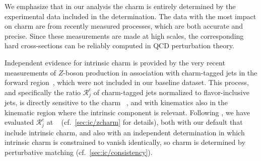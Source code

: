 We emphasize that in our analysis the charm \pdf is entirely
determined by the experimental data included in the \pdf determination.
The data with the most impact on charm are from recently measured \lhc
processes, which are both accurate and precise.
%
Since these measurements are made at high scales, the corresponding
hard cross-sections can be reliably computed in QCD perturbation theory.

Independent evidence for intrinsic charm
is provided by the very recent \lhcb measurements of $Z$-boson production
in association with charm-tagged jets in the forward
region~\cite{LHCb:2021stx}, which were not included in our baseline dataset.
%
This process, and specifically the ratio $\mathcal{R}_j^c$
of charm-tagged jets normalized to flavor-inclusive jets,
is directly sensitive to the charm \pdf~\cite{Boettcher:2015sqn}, and
with \lhcb kinematics also
in the kinematic region  where the  intrinsic component is relevant.
%
Following \cite{Boettcher:2015sqn,LHCb:2021stx}, we have  evaluated
$\mathcal{R}_j^c$ at \nlo~\cite{Alioli:2010xd,Sjostrand:2007gs} (cf.\
\cref{sec:ic/zcharm} for details), both with our default \pdfs that include
intrinsic charm, and also with an independent \pdf determination in which
intrinsic charm is constrained to vanish  identically, so charm is determined
by perturbative matching (cf.\ \cref{sec:ic/consistency}).

